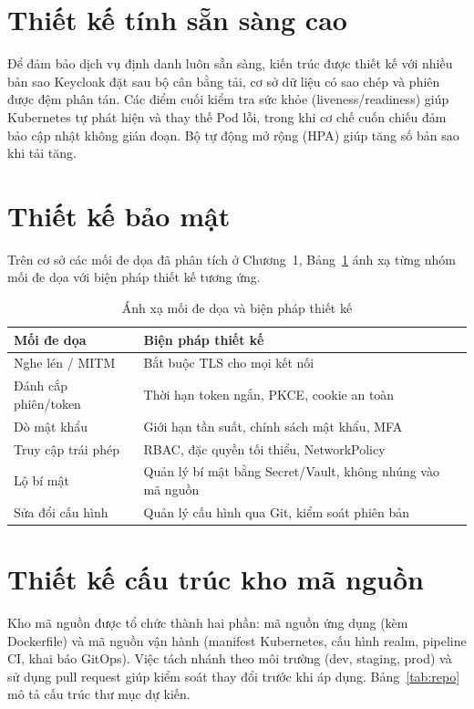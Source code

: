 \section{Thiết kế tính sẵn sàng cao}
\label{sec:ha}

Để đảm bảo dịch vụ định danh luôn sẵn sàng, kiến trúc được thiết kế với nhiều
bản sao Keycloak đặt sau bộ cân bằng tải, cơ sở dữ liệu có sao chép và phiên
được đệm phân tán. Các điểm cuối kiểm tra sức khỏe (liveness/readiness) giúp
Kubernetes tự phát hiện và thay thế Pod lỗi, trong khi cơ chế cuốn chiếu đảm
bảo cập nhật không gián đoạn. Bộ tự động mở rộng (HPA) giúp tăng số bản sao khi
tải tăng.

\section{Thiết kế bảo mật}
\label{sec:thietkebaomat}

Trên cơ sở các mối đe dọa đã phân tích ở Chương~1, Bảng~\ref{tab:secdesign}
ánh xạ từng nhóm mối đe dọa với biện pháp thiết kế tương ứng.

\begin{table}[htbp]
\centering
\caption{Ánh xạ mối đe dọa và biện pháp thiết kế}
\label{tab:secdesign}
\small
\begin{tabular}{p{3.4cm} p{9.4cm}}
\toprule
\textbf{Mối đe dọa} & \textbf{Biện pháp thiết kế}\\
\midrule
Nghe lén / MITM & Bắt buộc TLS cho mọi kết nối\\
Đánh cắp phiên/token & Thời hạn token ngắn, PKCE, cookie an toàn\\
Dò mật khẩu & Giới hạn tần suất, chính sách mật khẩu, MFA\\
Truy cập trái phép & RBAC, đặc quyền tối thiểu, NetworkPolicy\\
Lộ bí mật & Quản lý bí mật bằng Secret/Vault, không nhúng vào mã nguồn\\
Sửa đổi cấu hình & Quản lý cấu hình qua Git, kiểm soát phiên bản\\
\bottomrule
\end{tabular}
\end{table}

\section{Thiết kế cấu trúc kho mã nguồn}
\label{sec:repo}

Kho mã nguồn được tổ chức thành hai phần: mã nguồn ứng dụng (kèm Dockerfile) và
mã nguồn vận hành (manifest Kubernetes, cấu hình realm, pipeline CI, khai báo
GitOps). Việc tách nhánh theo môi trường (dev, staging, prod) và sử dụng pull
request giúp kiểm soát thay đổi trước khi áp dụng. Bảng~\ref{tab:repo} mô tả
cấu trúc thư mục dự kiến.


